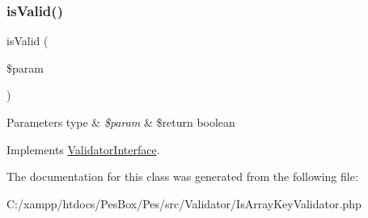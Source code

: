 \subsubsection{\texorpdfstring{is\+Valid()}{isValid()}}
{\footnotesize\ttfamily is\+Valid (\begin{DoxyParamCaption}\item[{}]{\$param }\end{DoxyParamCaption})}


\begin{DoxyParams}[1]{Parameters}
type & {\em \$param} & \$return boolean \\
\hline
\end{DoxyParams}


Implements \mbox{\hyperlink{interface_pes_1_1_validator_1_1_validator_interface_a250dbda694ce9c4d0dd4e71e1df35882}{Validator\+Interface}}.



The documentation for this class was generated from the following file\+:\begin{DoxyCompactItemize}
\item 
C\+:/xampp/htdocs/\+Pes\+Box/\+Pes/src/\+Validator/Is\+Array\+Key\+Validator.\+php\end{DoxyCompactItemize}
